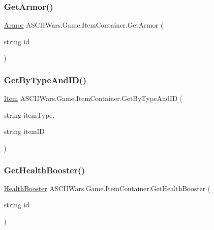 \subsubsection{\texorpdfstring{Get\+Armor()}{GetArmor()}}
{\footnotesize\ttfamily \hyperlink{class_a_s_c_i_i_wars_1_1_game_1_1_armor}{Armor} A\+S\+C\+I\+I\+Wars.\+Game.\+Item\+Container.\+Get\+Armor (\begin{DoxyParamCaption}\item[{string}]{id }\end{DoxyParamCaption})\hspace{0.3cm}{\ttfamily [inline]}}

\hypertarget{class_a_s_c_i_i_wars_1_1_game_1_1_item_container_aec1dfc18aa9c761e15c5421f50691331}{}\label{class_a_s_c_i_i_wars_1_1_game_1_1_item_container_aec1dfc18aa9c761e15c5421f50691331} 
\subsubsection{\texorpdfstring{Get\+By\+Type\+And\+I\+D()}{GetByTypeAndID()}}
{\footnotesize\ttfamily \hyperlink{class_a_s_c_i_i_wars_1_1_game_1_1_item}{Item} A\+S\+C\+I\+I\+Wars.\+Game.\+Item\+Container.\+Get\+By\+Type\+And\+ID (\begin{DoxyParamCaption}\item[{string}]{item\+Type,  }\item[{string}]{item\+ID }\end{DoxyParamCaption})\hspace{0.3cm}{\ttfamily [inline]}}

\hypertarget{class_a_s_c_i_i_wars_1_1_game_1_1_item_container_aa70c43020c6a423188df77bd7087feb1}{}\label{class_a_s_c_i_i_wars_1_1_game_1_1_item_container_aa70c43020c6a423188df77bd7087feb1} 
\subsubsection{\texorpdfstring{Get\+Health\+Booster()}{GetHealthBooster()}}
{\footnotesize\ttfamily \hyperlink{class_a_s_c_i_i_wars_1_1_game_1_1_health_booster}{Health\+Booster} A\+S\+C\+I\+I\+Wars.\+Game.\+Item\+Container.\+Get\+Health\+Booster (\begin{DoxyParamCaption}\item[{string}]{id }\end{DoxyParamCaption})\hspace{0.3cm}{\ttfamily [inline]}}

